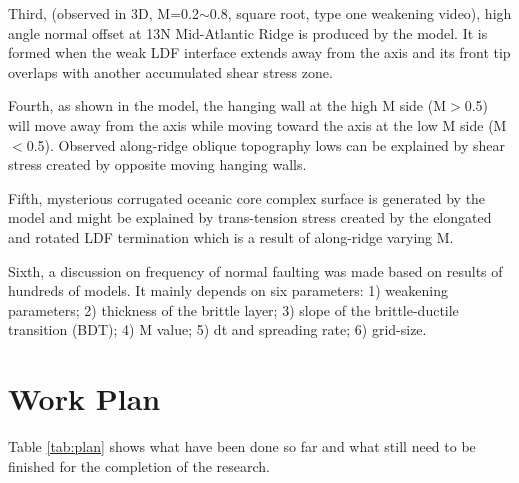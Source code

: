 \documentclass[12pt]{article}
\begin{document}
Third, (observed in 3D, M=0.2$\sim$0.8, square root, type one weakening video), high angle normal offset at 13\degree N Mid-Atlantic Ridge is produced by the model. It is formed when the weak LDF interface extends away from the axis and its front tip overlaps with another accumulated shear stress zone. 

Fourth, as shown in the model, the hanging wall at the high M side (M$>$0.5) will move away from the axis while moving toward the axis at the low M side (M$<$0.5). Observed along-ridge oblique topography lows can be explained by shear stress created by opposite moving hanging walls. 

Fifth, mysterious corrugated oceanic core complex surface is generated by the model and might be explained by trans-tension stress created by the elongated and rotated LDF termination which is a result of along-ridge varying M. 

Sixth, a discussion on frequency of normal faulting was made based on results of hundreds of models. It mainly depends on six parameters: 1) weakening parameters; 2) thickness of the brittle layer; 3) slope of the brittle-ductile transition (BDT); 4) M value; 5) dt and spreading rate; 6) grid-size.

\break
\section{Work Plan}
\label{ch:plan}

Table \ref{tab:plan} shows what have been done so far and what still need to be finished for the completion of the research.
\end{document}
